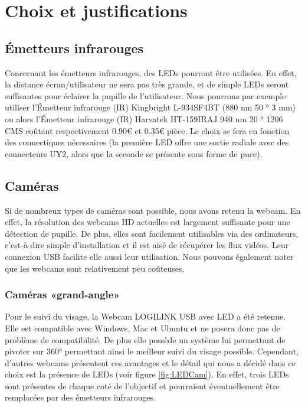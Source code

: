 \chapter{Choix et justifications}

\section{Émetteurs infrarouges}

Concernant les émetteurs infrarouges, des LEDs pourront être utilisées. En effet, la distance écran/utilisateur ne sera pas très grande, et de simple LEDs seront suffisantes pour éclairer la pupille de l'utilisateur. Nous pourrons par exemple utiliser l’Émetteur infrarouge (IR) Kingbright L-934SF4BT (880 nm 50 ° 3 mm) ou alors l’Émetteur infrarouge (IR) Harvatek HT-159IRAJ 940 nm 20 ° 1206 CMS coûtant respectivement 0.90€ et 0.35€ pièce. Le choix se fera en fonction des connectiques nécessaires (la première LED offre une sortie radiale avec des connecteurs UY2, alors que la seconde se présente sous forme de puce).

\section{Caméras}

Si de nombreux types de caméras sont possible, nous avons retenu la webcam. En effet, la résolution des webcams HD actuelles est largement suffisante pour une détection de pupille. De plus, elles sont facilement utilisables via des ordinateurs, c'est-à-dire simple d'installation et il est aisé de récupérer les flux vidéos. Leur connexion USB facilite elle aussi leur utilisation. Nous pouvons également noter que les webcams sont relativement peu coûteuses.


\subsection{Caméras «grand-angle»}

Pour le suivi du visage, la Webcam LOGILINK USB avec LED a été retenue. Elle est compatible avec Windows, Mac et Ubuntu et ne posera donc pas de problème de compatibilité. De plus elle possède un système lui permettant de pivoter sur 360° permettant ainsi le meilleur suivi du visage possible. Cependant, d'autres webcams présentent ces avantages et le détail qui nous a décidé dans ce choix est la présence de LEDs (voir figure \ref{fig:LEDCam}). En effet, trois LEDs sont présentes de chaque coté de l'objectif et pourraient éventuellement être remplacées par des émetteurs infrarouges.

